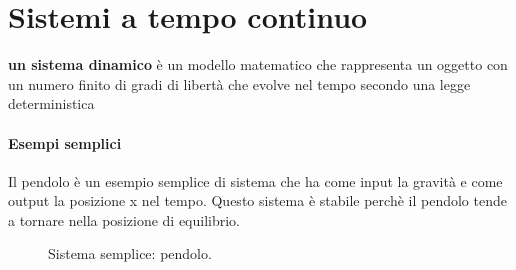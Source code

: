 
\chapter{Sistemi a tempo continuo}

	\begin{definizione}
		\textbf{un sistema dinamico} è un modello matematico che rappresenta un oggetto con un numero finito di gradi di libertà che evolve nel tempo secondo  una legge deterministica
	\end{definizione}
	\subsubsection{Esempi semplici}
		\begin{nexample}
			Il pendolo è un esempio semplice di sistema che ha come input la gravità e come output la posizione x nel tempo.
			Questo sistema è stabile perchè il pendolo tende a tornare nella posizione di equilibrio.
			
			\begin{figure}[H]
				\centering
				 \quad
				\caption{ Sistema semplice: pendolo. }
				\label{fig: pendolo}
			\end{figure}
			
			
		\end{nexample}

